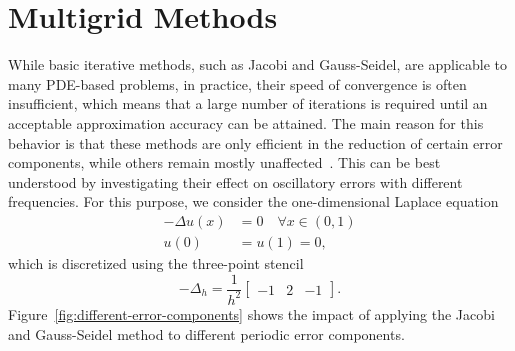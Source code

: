 \section{Multigrid Methods}\label{sec:multigrid-methods}
While basic iterative methods, such as Jacobi and Gauss-Seidel, are applicable to many PDE-based problems, in practice, their speed of convergence is often insufficient, which means that a large number of iterations is required until an acceptable approximation accuracy can be attained. 
The main reason for this behavior is that these methods are only efficient in the reduction of certain error components, while others remain mostly unaffected~\cite{briggs2000multigrid}.
This can be best understood by investigating their effect on oscillatory errors with different frequencies.
For this purpose, we consider the one-dimensional Laplace equation
\begin{equation}
		\begin{split}
			- \Delta u(x) & = 0 \quad \forall x \in (0, 1) \\
			u(0) & = u(1) = 0,
		\end{split}
		\label{eq:1D-laplace-model}
\end{equation}
which is discretized using the three-point stencil
\begin{equation}
	- \Delta_h = \frac{1}{h^2}\begin{bmatrix}
		-1 & 2 & -1
	\end{bmatrix}.
		\label{eq:1D-laplace-stencil}
\end{equation} 
Figure~\ref{fig:different-error-components} shows the impact of applying the Jacobi and Gauss-Seidel method to different periodic error components.
